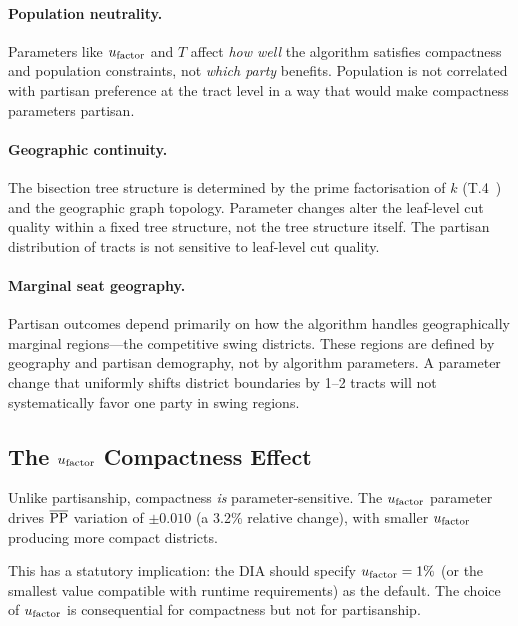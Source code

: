 \paragraph{Population neutrality.}
Parameters like $u_{\mathrm{factor}}$ and $T$ affect \emph{how well} the algorithm
satisfies compactness and population constraints, not \emph{which party}
benefits.
Population is not correlated with partisan preference at the tract level
in a way that would make compactness parameters partisan.

\paragraph{Geographic continuity.}
The bisection tree structure is determined by the prime factorisation of $k$
(T.4~\citep{b11paper}) and the geographic graph topology.
Parameter changes alter the leaf-level cut quality within a fixed tree structure,
not the tree structure itself.
The partisan distribution of tracts is not sensitive to leaf-level cut quality.

\paragraph{Marginal seat geography.}
Partisan outcomes depend primarily on how the algorithm handles
geographically marginal regions---the competitive swing districts.
These regions are defined by geography and partisan demography, not by
algorithm parameters.
A parameter change that uniformly shifts district boundaries by 1--2 tracts
will not systematically favor one party in swing regions.

\subsection{The $u_{\mathrm{factor}}$ Compactness Effect}

Unlike partisanship, compactness \emph{is} parameter-sensitive.
The $u_{\mathrm{factor}}$ parameter drives $\overline{\mathrm{PP}}$ variation of $\pm 0.010$
(a 3.2\% relative change), with smaller $u_{\mathrm{factor}}$ producing more compact
districts.

This has a statutory implication: the DIA should specify $u_{\mathrm{factor}} = 1\%$
(or the smallest value compatible with runtime requirements) as the default.
The choice of $u_{\mathrm{factor}}$ is consequential for compactness but not for
partisanship.
